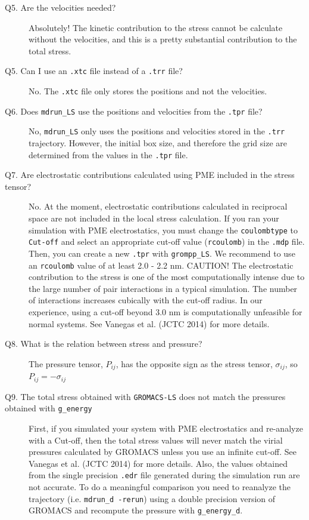 \documentclass[10pt,letterpaper,notitlepage]{article}
\begin{document}
\begin{description}
\item[Q5. Are the velocities needed?] Absolutely! The kinetic contribution to the stress cannot be calculate without the velocities, and this is a pretty substantial contribution to the total stress.

\item[Q5. Can I use an \texttt{.xtc} file instead of a \texttt{.trr} file?] No. The \texttt{.xtc} file only stores the positions and not the velocities.

\item[Q6. Does \texttt{mdrun\_LS} use the positions and velocities from the \texttt{.tpr} file?] No, \texttt{mdrun\_LS} only uses the positions and velocities stored in the \texttt{.trr} trajectory. However, the initial box size, and therefore the grid size are determined from the values in the \texttt{.tpr} file.

\item[Q7. Are electrostatic contributions calculated using PME included in the stress tensor?] No. At the moment, electrostatic contributions calculated in reciprocal space are not included in the local stress calculation. If you ran your simulation with PME electrostatics, you must change the \texttt{coulombtype} to \texttt{Cut-off} and select an appropriate cut-off value (\texttt{rcoulomb}) in the \texttt{.mdp} file. Then, you can create a new \texttt{.tpr} with \texttt{grompp\_LS}. We recommend to use an \texttt{rcoulomb} value of at least 2.0 - 2.2 nm. CAUTION! The electrostatic contribution to the stress is one of the most computationally intense due to the large number of pair interactions in a typical simulation. The number of interactions increases cubically with the cut-off radius. In our experience, using a cut-off beyond 3.0 nm is computationally unfeasible for normal systems. See Vanegas et al. (JCTC 2014) for more details.

\item[Q8. What is the relation between stress and pressure?] The pressure tensor, $P_{ij}$, has the opposite sign as the stress tensor, $\sigma_{ij}$, so $P_{ij} = -\sigma_{ij}$

\item[Q9. The total stress obtained with \texttt{GROMACS-LS} does not match the pressures obtained with \texttt{g\_energy}] First, if you simulated your system with PME electrostatics and re-analyze with a Cut-off, then the total stress values will never match the virial pressures calculated by GROMACS unless you use an infinite cut-off. See Vanegas et al. (JCTC 2014) for more details. Also, the values obtained from the single precision \texttt{.edr} file generated during the simulation run are not accurate. To do a meaningful comparison you need to reanalyze the trajectory (i.e. \texttt{mdrun\_d -rerun}) using a double precision version of GROMACS and recompute the pressure with \texttt{g\_energy\_d}.


\end{description}
\end{document}
